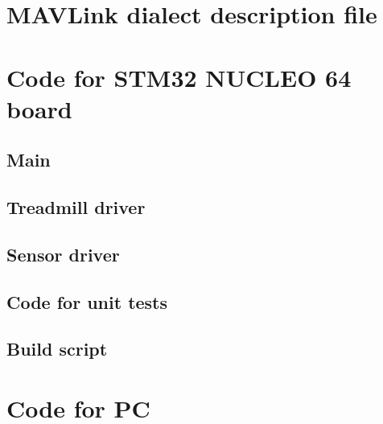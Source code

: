 \documentclass[12pt,a4paper]{article}
\begin{document}
\section{MAVLink dialect description file}\label{app:mavlink}

\section{Code for STM32 NUCLEO 64 board}
\subsection{Main}


\subsection{Treadmill driver}


\subsection{Sensor driver}


\subsection{Code for unit tests}








\subsection{Build script}


\section{Code for PC}
\end{document}
